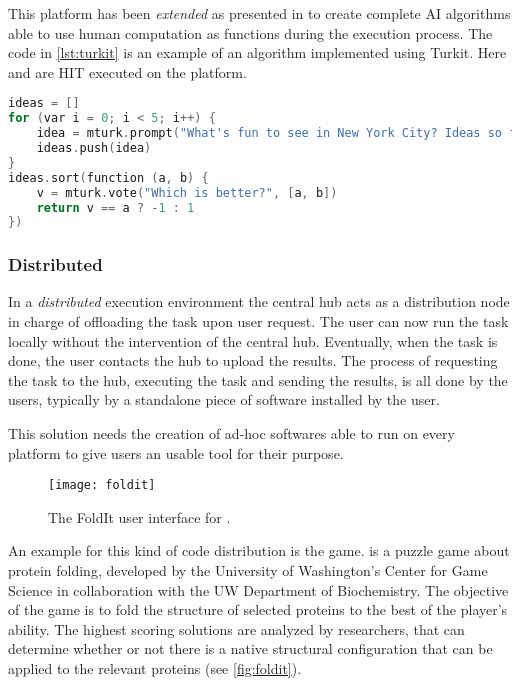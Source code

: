 This platform has been \emph{extended} as presented in \cite{little2010turkit}
to create complete \acl{AI} algorithms able to use human computation as functions
during the execution process. The code in \autoref{lst:turkit} is an example of an
algorithm implemented using Turkit. Here  and 
are \acl{HIT} executed on the  platform.
\begin{lstlisting}[language=C++,caption={Example of a Turkit algorithm.},
label={lst:turkit}]
ideas = []
for (var i = 0; i < 5; i++) {
	idea = mturk.prompt("What's fun to see in New York City? Ideas so far: " + ideas.join(", "))
	ideas.push(idea)
}
ideas.sort(function (a, b) {
	v = mturk.vote("Which is better?", [a, b])
	return v == a ? -1 : 1
})
\end{lstlisting}







\subsubsection{Distributed}
In a \emph{distributed} execution environment the central hub acts as a distribution
node in charge of offloading the task upon user request. The user can now run the
task locally without the intervention of the central hub. Eventually, when the task
is done, the user contacts the hub to upload the results.
The process of requesting the task to the hub, executing the task and sending the
results, is all done by the users, typically by a standalone piece of software
installed by the user.

This solution needs the creation of ad-hoc softwares able to run on every platform
to give users an usable tool for their purpose.\\


\begin{figure}[htb]
    \centering
    \texttt{[image: foldit]}
    \caption{The FoldIt user interface for .}
    \label{fig:foldit}
\end{figure}
An example for this kind of code distribution is the  game.
 is a puzzle game about protein folding, developed
by the University of Washington's Center for Game Science in collaboration with
the UW Department of Biochemistry. The objective of the game is to fold the
structure of selected proteins to the best of the player's ability. The highest
scoring solutions are analyzed by researchers, that can determine whether or not
there is a native structural configuration that can be applied to the relevant
proteins (see \autoref{fig:foldit}).








